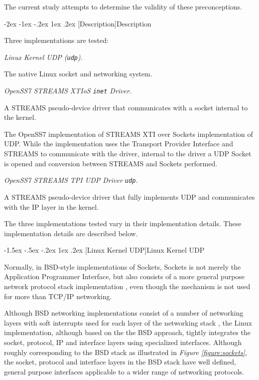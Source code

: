 \documentclass[letterpaper,final,notitlepage,twocolumn,10pt,twoside]{article}
\makeatletter
\renewcommand\section{\@startsection {section}{1}{\z@}%
                                   {-2ex \@plus -1ex \@minus -.2ex}%
                                   {1ex \@plus .2ex}%
                                   {\normalfont\large\bfseries}}
\renewcommand\subsection{\@startsection{subsection}{2}{\z@}%
                                     {-1.5ex \@plus -.5ex \@minus -.2ex}%
                                     {1ex \@plus .2ex}%
                                     {\normalfont\normalsize\bfseries}}
\makeatother
\begin{document}
The current study attempts to determine the validity of these preconceptions.

\section[Description]{Description}

Three implementations are tested:

\begin{description}

\item {\it Linux Kernel UDP ({\tt udp}).}

The native Linux socket and networking system.

\item {\it OpenSS7 STREAMS XTIoS {\tt inet} Driver.}

A STREAMS pseudo-device driver that communicates with a socket internal to the kernel.

The OpenSS7 implementation of STREAMS XTI over Sockets implementation of UDP.  While the
implementation uses the Transport Provider Interface and STREAMS to communicate with the driver,
internal to the driver a UDP Socket is opened and conversion between STREAMS and Sockets performed.

\item {\it OpenSS7 STREAMS TPI UDP Driver {\tt udp}.}

A STREAMS pseudo-device driver that fully implements UDP and communicates with the IP layer in the
kernel.

\end{description}

The three implementations tested vary in their implementation details.  These implementation details
are described below.

\subsection[Linux Kernel UDP]{Linux Kernel UDP}
\label{section:lkudp}

Normally, in BSD-style implementations of Sockets, Sockets is not merely the Application Programmer
Interface, but also consists of a more general purpose network protocol stack implementation
\cite[]{bsd}, even though the mechanism is not used for more than TCP/IP networking.  \cite[]{magic}

Although BSD networking implementations consist of a number of networking layers with soft
interrupts used for each layer of the networking stack \cite[]{bsd}, the Linux implementation,
although based on the the BSD approach, tightly integrates the socket, protocol, IP and interface
layers using specialized interfaces.  Although roughly corresponding to the BSD stack as illustrated
in \textit{Figure \ref{figure:sockets}}, the socket, protocol and interface layers in the BSD stack
have well defined, general purpose interfaces applicable to a wider range of networking protocols.
\end{document}
